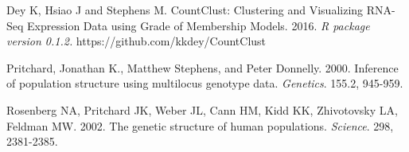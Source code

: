 \documentclass[12pt]{article}\usepackage[]{graphicx}\usepackage[usenames,dvipsnames]{color}
\begin{document}
\begin{thebibliography}{9}

Dey K, Hsiao J and Stephens M.
CountClust: Clustering and Visualizing RNA-Seq Expression Data using Grade of Membership Models. 2016.
\textit{R package version 0.1.2.} https://github.com/kkdey/CountClust

Pritchard, Jonathan K., Matthew Stephens, and Peter Donnelly. 2000.
Inference of population structure using multilocus genotype data.
\textit{Genetics}. 155.2,  945-959.

Rosenberg NA, Pritchard JK,  Weber JL, Cann HM,  Kidd KK,  Zhivotovsky LA,  Feldman MW. 2002.
The genetic structure of human populations.
\textit{Science}. 298,  2381-2385.







\end{thebibliography}
\end{document}
